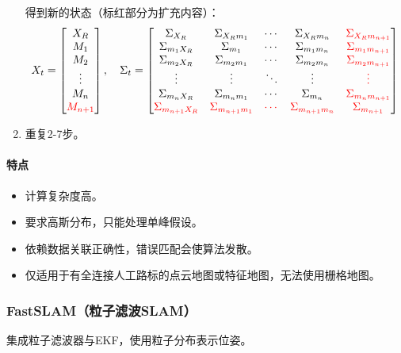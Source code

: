 \documentclass[
12pt, %
a4paper, 
oneside, %
headinclude,footinclude, %
]{scrartcl}
\begin{document}
\begin{enumerate}
得到新的状态（标红部分为扩充内容）：
\begin{align*}
X_t = \begin{bmatrix} X_R \\ M_1 \\ M_2 \\ \vdots \\ M_n \\ \color{red} M_{n + 1} \end{bmatrix}, \quad
\Sigma_t = \begin{bmatrix} 
\Sigma_{X_R} & \Sigma_{X_R m_1} & \cdots & \Sigma_{X_R m_n} & \color{red}\Sigma_{X_R m_{n + 1}} \\
\Sigma_{m_1 X_R} & \Sigma_{m_1} & \cdots & \Sigma_{m_1 m_n} & \color{red}\Sigma_{m_1 m_{n + 1}} \\
\Sigma_{m_2 X_R} & \Sigma_{m_2 m_1} & \cdots & \Sigma_{m_2 m_n} & \color{red}\Sigma_{m_2 m_{n + 1}} \\
\vdots & \vdots & \ddots & \vdots & \color{red}\vdots \\
\Sigma_{m_n X_R} & \Sigma_{m_n m_1} & \cdots & \Sigma_{m_n} & \color{red}\Sigma_{m_n m_{n + 1}} \\
\color{red}\Sigma_{m_{n + 1} X_R} & \color{red}\Sigma_{m_{n + 1} m_1} & \color{red}\cdots & \color{red}\Sigma_{m_{n + 1} m_n} & \color{red}\Sigma_{m_{n + 1}}
\end{bmatrix}
\end{align*}
\item 重复2-7步。
\end{enumerate}
\paragraph{特点}
\begin{itemize}
\item 计算复杂度高。
\item 要求高斯分布，只能处理单峰假设。
\item 依赖数据关联正确性，错误匹配会使算法发散。
\item 仅适用于有全连接人工路标的点云地图或特征地图，无法使用栅格地图。
\end{itemize}
\subsubsection[FastSLAM]{FastSLAM（粒子滤波SLAM）}
集成粒子滤波器与EKF，使用粒子分布表示位姿。
\end{document}
